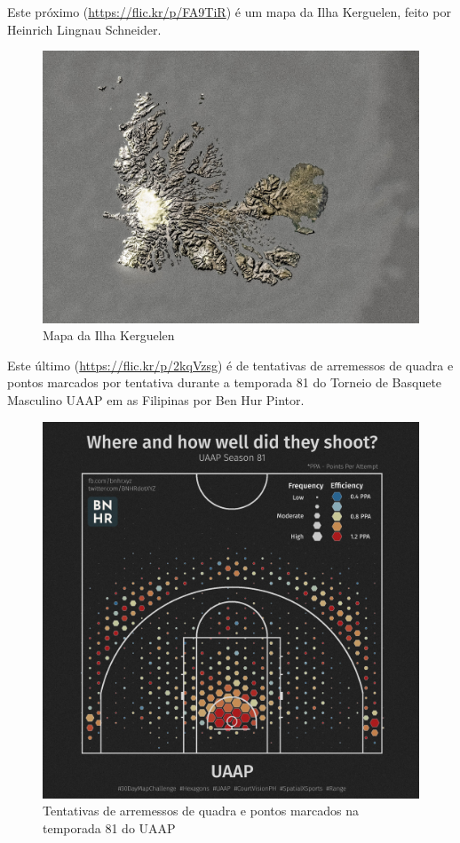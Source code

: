 \documentclass[
]{krantz}
\begin{document}
Este próximo (\url{https://flic.kr/p/FA9TiR}) é um mapa da Ilha Kerguelen, feito por Heinrich Lingnau Schneider.

\begin{figure}
\centering
\includegraphics{media/modulo1/sample-3.jpg}
\caption{Mapa da Ilha Kerguelen}
\end{figure}

Este último (\href{https://flic.kr/p/v2kqVzsg}{https://flic.kr/p/2kqVzsg}) é de tentativas de arremessos de quadra e pontos marcados por tentativa durante a temporada 81 do Torneio de Basquete Masculino UAAP em as Filipinas por Ben Hur Pintor.

\begin{figure}
\centering
\includegraphics{media/modulo1/sample-4.jpg}
\caption{Tentativas de arremessos de quadra e pontos marcados na temporada 81 do UAAP}
\end{figure}
\end{document}
